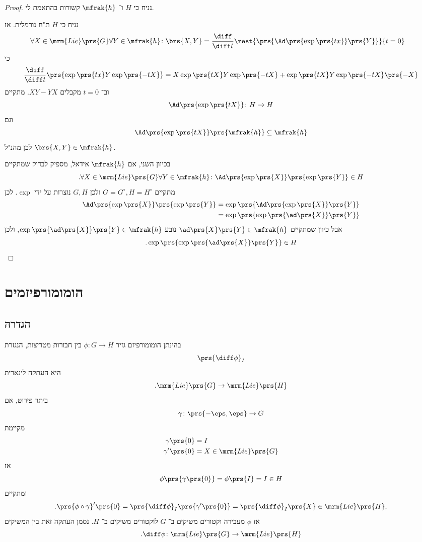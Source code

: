 \documentclass[10pt, twoside]{book}
\begin{document}
\begin{proof}
נניח כי
$H$
ו־%
$\mfrak{h}$
קשורות בהתאמת לי.

נניח כי
$H$
ת"ח נורמלית. אז
\begin{align*}
\forall X \in \mrm{Lie}\prs{G} \forall Y \in \mfrak{h} \colon \brs{X,Y} &= \frac{\diff}{\diff t} \rest{\prs{\Ad \prs{\exp\prs{tx}}\prs{Y}}}{t=0}
\end{align*}
כי
\begin{align*}
\frac{\diff}{\diff t} \prs{\exp\prs{tx} Y \exp\prs{-tX}} = X \exp\prs{tX} Y \exp\prs{-tX} + \exp\prs{tX} Y \exp\prs{-tX} \prs{-X}
\end{align*}
וב־%
$t = 0$
מקבלים
$XY - YX$.
מתקיים
\[\Ad\prs{\exp\prs{tX}} \colon H \to H\]
וגם
\[\Ad\prs{\exp\prs{tX}}\prs{\mfrak{h}} \subseteq \mfrak{h}\]
לכן מהנ"ל
$\brs{X,Y} \in \mfrak{h}$.

בכיוון השני, אם
$\mfrak{h}$
אידאל, מספיק לבדוק שמתקיים
\[\text{.}\forall X \in \mrm{Lie}\prs{G} \forall Y \in \mfrak{h} \colon \Ad\prs{\exp\prs{X}} \prs{\exp\prs{Y}} \in H\]
מתקיים
$G = G^\circ, H = H^\circ$
ולכן
$G,H$
נוצרות על ידי
$\exp$.
לכן
\begin{align*}
\Ad\prs{\exp\prs{X}} \prs{\exp\prs{Y}} &=
\exp\prs{\Ad\prs{\exp\prs{X}}\prs{Y}} \\&=
\exp\prs{\exp\prs{\ad\prs{X}}\prs{Y}}
\end{align*}
אבל כיוון שמתקיים
$\ad\prs{X} \prs{Y} \in \mfrak{h}$
נובע
$\exp \prs{\ad\prs{X}}\prs{Y} \in \mfrak{h}$,
ולכן
\[\text{.} \exp\prs{\exp\prs{\ad\prs{X}}\prs{Y}} \in H\]
\end{proof}

\section{הומומורפיזמים}

\subsection{הגדרה}

בהינתן הומומורפיזם גזיר
$\phi \colon G \to H$
בין חבורות מטריצות, הנגזרת
\[\prs{\diff \phi}_I\]
היא העתקה לינארית
\[\text{.} \mrm{Lie}\prs{G} \to \mrm{Lie}\prs{H}\]
ביתר פירוט, אם
\[\gamma \colon \prs{-\eps, \eps} \to G\]
מקיימת
\begin{align*}
\gamma\prs{0} &= I \\
\gamma'\prs{0} &= X \in \mrm{Lie}\prs{G}
\end{align*}
אז
\[\phi\prs{\gamma\prs{0}} = \phi\prs{I} = I \in H\]
ומתקיים
\[\text{.} \prs{\phi \circ \gamma}' \prs{0} = \prs{\diff \phi}_I \prs{\gamma'\prs{0}} = \prs{\diff \phi}_I \prs{X} \in \mrm{Lie}\prs{H} \text{,}\]
אז
$\phi$
מעבירה וקטורים משיקים ב־%
$G$
לוקטורים משיקים ב־%
$H$.
נסמן העתקה זאת בין המשיקים
\[ \text{.} \diff \phi \colon \mrm{Lie}\prs{G} \to \mrm{Lie}\prs{H}\]
\end{document}
